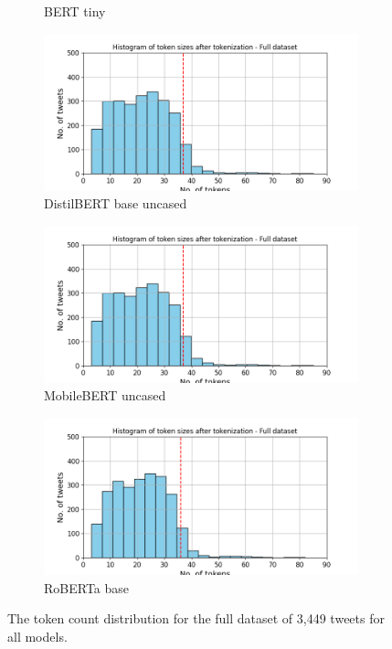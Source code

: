 \begin{figure}[htbp]
\begin{subfigure}[b]{0.48\textwidth}
        \caption{BERT tiny}
        \label{fig: token_pp_hist_tiny}
    \end{subfigure}
    \hfill
    \begin{subfigure}[b]{0.48\textwidth}
        \includegraphics[width=\textwidth]{figures/token_pp_hist_distilbert-base-uncased.png}
        \caption{DistilBERT base uncased}
        \label{fig: token_pp_hist_distilbert}
    \end{subfigure}
    \begin{subfigure}[b]{0.48\textwidth}
        \includegraphics[width=\textwidth]{figures/token_pp_hist_google-mobilebert-uncased.png}
        \caption{MobileBERT uncased}
        \label{fig: token_pp_hist_mobile}
    \end{subfigure}
    \hfill
    \begin{subfigure}[b]{0.48\textwidth}
        \includegraphics[width=\textwidth]{figures/token_pp_hist_roberta-base.png}
        \caption{RoBERTa base}
        \label{fig: token_pp_hist_roberta}
    \end{subfigure}
    \caption{The token count distribution for the full dataset of 3,449 tweets for all models.}
    \label{fig: apdxa_tokens}
\end{figure}

